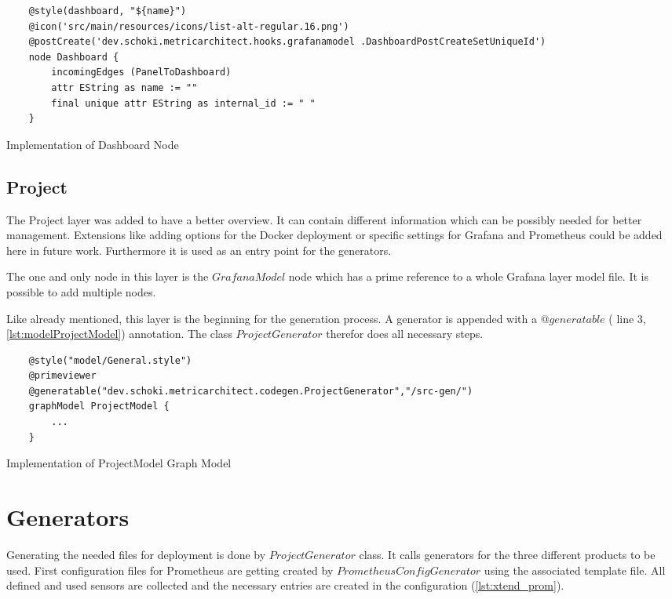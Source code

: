\begin{listing}[!ht]
	\begin{verbatim}
	@style(dashboard, "${name}")
	@icon('src/main/resources/icons/list-alt-regular.16.png')
	@postCreate('dev.schoki.metricarchitect.hooks.grafanamodel .DashboardPostCreateSetUniqueId')
	node Dashboard {
		incomingEdges (PanelToDashboard)
		attr EString as name := ""
		final unique attr EString as internal_id := " " 
	}
	\end{verbatim}
	\caption{Implementation of Dashboard Node}
	\label{lst:nodeDashboard}
\end{listing}
\subsection{Project}
The Project layer was added to have a better overview. It can contain different information which can be possibly needed for better management. Extensions like adding options for the Docker deployment or specific settings for Grafana and Prometheus could be added here in future work. Furthermore it is used as an entry point for the generators. 

The one and only node in this layer is the $GrafanaModel$ node which has a prime reference to a whole Grafana layer model file. It is possible to add multiple nodes.

Like already mentioned, this layer is the beginning for the generation process. A generator is appended with a $@generatable$ ( line 3, \cref{lst:modelProjectModel}) annotation. The class $ProjectGenerator$ therefor does all necessary steps. 

\begin{listing}[!ht]
	\begin{verbatim}
	@style("model/General.style")
	@primeviewer
	@generatable("dev.schoki.metricarchitect.codegen.ProjectGenerator","/src-gen/")
	graphModel ProjectModel {
		...
	}
	\end{verbatim}
	\caption{Implementation of ProjectModel Graph Model}
	\label{lst:modelProjectModel}
\end{listing}

\section{Generators}
\label{sec:impl_generator}

Generating the needed files for deployment is done by $ProjectGenerator$ class. It calls generators for the three different products to be used. First configuration files for Prometheus are getting created by $PrometheusConfigGenerator$ using the associated template file. All defined and used sensors are collected and the necessary entries are created in the configuration (\cref{lst:xtend_prom}).

